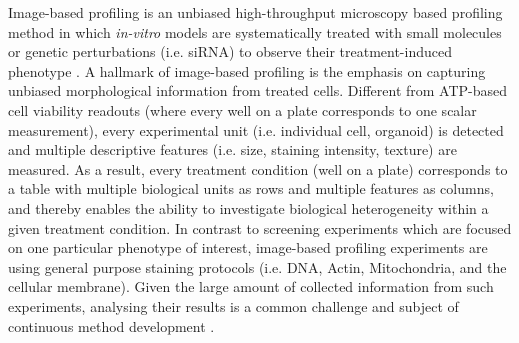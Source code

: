 \begin{flushleft}
Image-based profiling is an unbiased high-throughput microscopy based profiling method in which \textit{in-vitro} models are systematically treated with small molecules or genetic perturbations (i.e. siRNA) to observe their treatment-induced phenotype \parencite{carpenterImagebasedChemicalScreening2007, caicedoApplicationsImagebasedProfiling2016}. A hallmark of image-based profiling is the emphasis on capturing unbiased morphological information from treated cells. Different from ATP-based cell viability readouts (where every well on a plate corresponds to one scalar measurement), every experimental unit (i.e. individual cell, organoid) is detected and multiple descriptive features (i.e. size, staining intensity, texture) are measured. As a result, every treatment condition (well on a plate) corresponds to a table with multiple biological units as rows and multiple features as columns, and thereby enables the ability to investigate biological heterogeneity within a given treatment condition. In contrast to screening experiments which are focused on one particular phenotype of interest, image-based profiling experiments are using general purpose staining protocols (i.e. DNA, Actin, Mitochondria, and the cellular membrane). Given the large amount of collected information from such experiments, analysing their results is a common challenge and subject of continuous method development \parencite{chandrasekaranImagebasedProfilingDrug2021}. 
\par


\end{flushleft}
